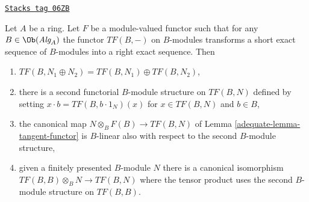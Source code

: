 \begin{lemma}
\label{adequate-lemma-exactness-implies}
\href{https://stacks.math.columbia.edu/tag/06ZB}{\texttt{Stacks tag 06ZB}}

Let $A$ be a ring. Let $F$ be a module-valued functor
such that for any $B \in \Ob(\textit{Alg}_A)$ the
functor $TF(B, -)$ on $B$-modules transforms a short exact sequence
of $B$-modules into a right exact sequence. Then
\begin{enumerate}
\item $TF(B, N_1 \oplus N_2) = TF(B, N_1) \oplus TF(B, N_2)$,
\item there is a second functorial $B$-module structure on $TF(B, N)$
defined by setting $x \cdot b = TF(B, b\cdot 1_N)(x)$ for $x \in TF(B, N)$
and $b \in B$,
\item
\label{adequate-item-mult-map-linear}
the canonical map $N \otimes_B F(B) \to TF(B, N)$ of
Lemma \ref{adequate-lemma-tangent-functor}
is $B$-linear also with respect to the second $B$-module structure,
\item
\label{adequate-item-tangent-right-exact}
given a finitely presented $B$-module $N$ there is a canonical
isomorphism $TF(B, B) \otimes_B N \to TF(B, N)$ where the tensor
product uses the second $B$-module structure on $TF(B, B)$.
\end{enumerate}
\end{lemma}

